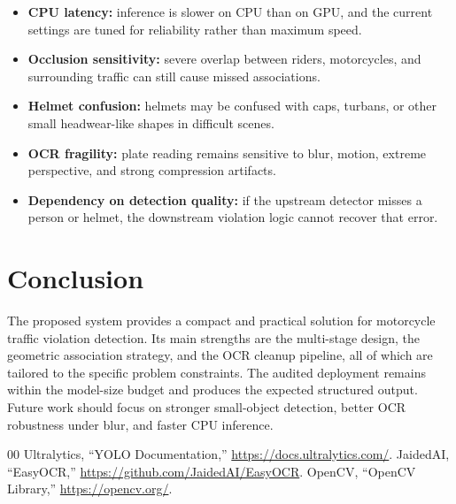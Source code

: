 \documentclass[conference]{IEEEtran}
\begin{document}
\begin{itemize}
        \item \textbf{CPU latency:} inference is slower on CPU than on GPU, and the current settings are tuned for reliability rather than maximum speed.
        \item \textbf{Occlusion sensitivity:} severe overlap between riders, motorcycles, and surrounding traffic can still cause missed associations.
        \item \textbf{Helmet confusion:} helmets may be confused with caps, turbans, or other small headwear-like shapes in difficult scenes.
        \item \textbf{OCR fragility:} plate reading remains sensitive to blur, motion, extreme perspective, and strong compression artifacts.
        \item \textbf{Dependency on detection quality:} if the upstream detector misses a person or helmet, the downstream violation logic cannot recover that error.
\end{itemize}

\section{Conclusion}
The proposed system provides a compact and practical solution for motorcycle traffic violation detection. Its main strengths are the multi-stage design, the geometric association strategy, and the OCR cleanup pipeline, all of which are tailored to the specific problem constraints. The audited deployment remains within the model-size budget and produces the expected structured output. Future work should focus on stronger small-object detection, better OCR robustness under blur, and faster CPU inference.

\begin{thebibliography}{00}
 Ultralytics, ``YOLO Documentation,'' \url{https://docs.ultralytics.com/}.
 JaidedAI, ``EasyOCR,'' \url{https://github.com/JaidedAI/EasyOCR}.
 OpenCV, ``OpenCV Library,'' \url{https://opencv.org/}.
\end{thebibliography}
\end{document}
